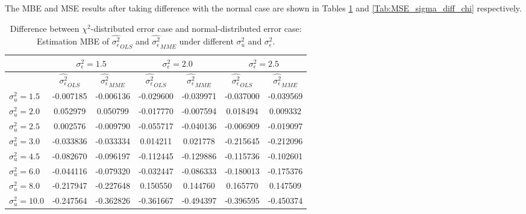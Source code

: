 \documentclass{article}
\begin{document}
The MBE and MSE results after taking difference with the normal case are shown in Tables \ref{Tab:MBE_sigma_diff_chi} and \ref{Tab:MSE_sigma_diff_chi} respectively. 

\begin{table}[ht]
    \centering
    \caption{Difference between $\chi^2$-distributed error case and normal-distributed error case: Estimation MBE of $\hat{\sigma^2_\epsilon}_{OLS}$ and $\hat{\sigma^2_\epsilon}_{MME}$ under different $\sigma^2_u$ and $\sigma^2_\epsilon$.}
    \label{Tab:MBE_sigma_diff_chi}
    \begin{tabular}[t]{lcccccc}
        \hline
        &\multicolumn{2}{c}{$\sigma^2_\epsilon=1.5$}&\multicolumn{2}{c}{$\sigma^2_\epsilon=2.0$}&\multicolumn{2}{c}{$\sigma^2_\epsilon=2.5$}\\
        \hline
        &$\hat{\sigma^2_\epsilon}_{OLS}$&$\hat{\sigma^2_\epsilon}_{MME}$&$\hat{\sigma^2_\epsilon}_{OLS}$&
        $\hat{\sigma^2_\epsilon}_{MME}$&$\hat{\sigma^2_\epsilon}_{OLS}$&$\hat{\sigma^2_\epsilon}_{MME}$\\
        \hline
        $\sigma^2_u = 1.5$&-0.007185&-0.006136&-0.029600&-0.039971&-0.037000&-0.039569\\
        $\sigma^2_u = 2.0$&0.052979&0.050799&-0.017770&-0.007594&0.018494&0.009332\\
        $\sigma^2_u = 2.5$&0.002576&-0.009790&-0.055717&-0.040136&-0.006909&-0.019097\\
        $\sigma^2_u = 3.0$&-0.033836&-0.033334&0.014211&0.021778&-0.215645&-0.212096\\
        $\sigma^2_u = 4.5$&-0.082670&-0.096197&-0.112445&-0.129886&-0.115736&-0.102601\\
        $\sigma^2_u = 6.0$&-0.044116&-0.079320&-0.032447&-0.086333&-0.180013&-0.175376\\
        $\sigma^2_u = 8.0$&-0.217947&-0.227648&0.150550&0.144760&0.165770&0.147509\\
        $\sigma^2_u = 10.0$&-0.247564&-0.362826&-0.361667&-0.494397&-0.396595&-0.450374\\
        \hline
    \end{tabular}
\end{table}
\end{document}
